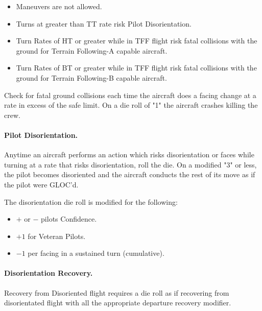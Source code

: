 \begin{advancedrules}
{\begin{itemize}

    \item {} Maneuvers are not allowed.

    \item Turns at greater than TT rate risk Pilot Disorientation.

    \item Turn Rates of HT or greater while in TFF flight risk fatal collisions with the ground for Terrain Following-A capable aircraft.  

    \item Turn Rates of BT or greater while in TFF flight risk fatal collisions with the ground for Terrain Following-B capable aircraft.


\end{itemize}

Check for fatal ground collisions each time the aircraft does a facing change at a rate in excess of the safe limit. On a die roll of "1" the aircraft crashes killing the crew.

\paragraph{Pilot Disorientation.} Anytime an aircraft performs an action which risks disorientation or faces while turning at a rate that risks disorientation, roll the die. On a modified "3" or less, the pilot becomes disoriented and the aircraft conducts the rest of its move as if the pilot were GLOC'd. 

The disorientation die roll is modified for the following:
\begin{itemize}
    \item $+$ or $-$ pilots Confidence.
    \item $+1$ for Veteran Pilots.
    \item $-1$ per facing in a sustained turn (cumulative).
\end{itemize}

\paragraph{Disorientation Recovery.} Recovery from Disoriented flight requires a die roll as if recovering from disorientated flight with all the appropriate departure recovery modifier.

}
\end{advancedrules}
